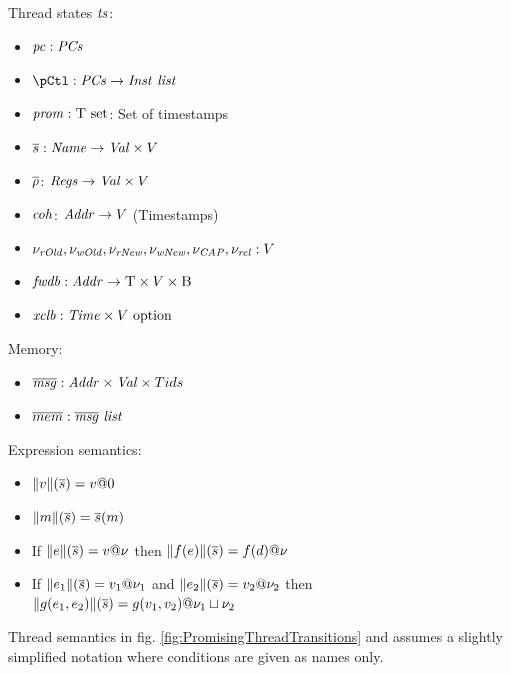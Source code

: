Thread states $\mathit{ts}$:
\begin{itemize}
\item $\mathit{pc}:\mathit{PCs}$
\item $\pCtl:\PCs\rightarrow \Inst\ \mathit{list}$
\item $\Promises: \Timestamps\ \mbox{set}$: Set of timestamps
\item $\overline{s}:\mathit{Name}\rightarrow \mathit{Val}\times V$
\item $\mathit{\overline{\rho}}$: $\mathit{Regs} \rightarrow \mathit{Val} \times V$
\item $\mathit{coh}$: $\mathit{Addr} \rightarrow V$ (Timestamps)
\item $\nu_{\mathit{rOld}},\nu_{\mathit{wOld}},\nu_{\mathit{rNew}},\nu_{\mathit{wNew}},\nu_{\mathit{CAP}}, \nu_{\mathit{rel}}:V$
\item $\mathit{fwdb}: \mathit{Addr} \rightarrow \mbox{\sc T} \times V \times \mbox{\sc B}$
\item $\xclb: \TimeStamps \times \Views\ \mbox{option}$
\end{itemize}

Memory:
\begin{itemize}
\item $\overline{\mathit{msg}}: \mathit{Addr}\times\mathit{Val}\times Tids$
\item $\pMem: \pMsg\ \mathit{list}$
\end{itemize}

Expression semantics:
\begin{itemize}
\item $\mbox{$\parallel$}{v}{\mbox{$\parallel$}({\overline{s}})} = v@0$
\item $\mbox{$\parallel$}{m}{\mbox{$\parallel$}({\overline{s}})} = \overline{s}(m)$
\item If $\mbox{$\parallel$}{e}{\mbox{$\parallel$}({\overline{s}})} = v@\nu$ then $\mbox{$\parallel$}{f(e)}{\mbox{$\parallel$}({\overline{s}})} = f(d)@\nu$
\item If $\mbox{$\parallel$}{e_1}{\mbox{$\parallel$}({\overline{s}})} = v_1@\nu_1$ and $\mbox{$\parallel$}{e_2}{\mbox{$\parallel$}({\overline{s}})} = v_2@\nu_2$ then $\mbox{$\parallel$}{g(e_1,e_2)}{\mbox{$\parallel$}({\overline{s}})} = g(v_1,v_2)@\nu_1\sqcup\nu_2$
\end{itemize}

Thread semantics in fig. \ref{fig:PromisingThreadTransitions} and assumes a slightly simplified notation where conditions are given as names only.  

